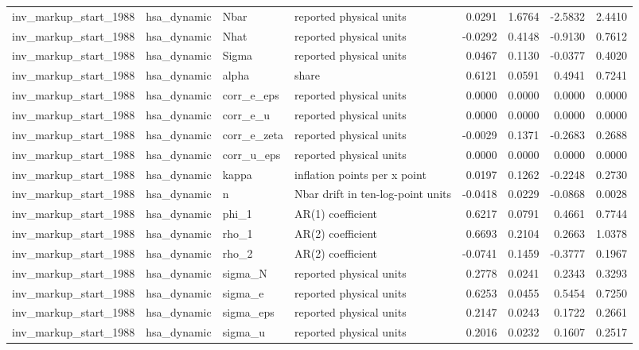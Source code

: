 \begin{tabular}{llllrrrr}
inv\_markup\_start\_1988 & hsa\_dynamic & Nbar & reported physical units & 0.0291 & 1.6764 & -2.5832 & 2.4410 \\
inv\_markup\_start\_1988 & hsa\_dynamic & Nhat & reported physical units & -0.0292 & 0.4148 & -0.9130 & 0.7612 \\
inv\_markup\_start\_1988 & hsa\_dynamic & Sigma & reported physical units & 0.0467 & 0.1130 & -0.0377 & 0.4020 \\
inv\_markup\_start\_1988 & hsa\_dynamic & alpha & share & 0.6121 & 0.0591 & 0.4941 & 0.7241 \\
inv\_markup\_start\_1988 & hsa\_dynamic & corr\_e\_eps & reported physical units & 0.0000 & 0.0000 & 0.0000 & 0.0000 \\
inv\_markup\_start\_1988 & hsa\_dynamic & corr\_e\_u & reported physical units & 0.0000 & 0.0000 & 0.0000 & 0.0000 \\
inv\_markup\_start\_1988 & hsa\_dynamic & corr\_e\_zeta & reported physical units & -0.0029 & 0.1371 & -0.2683 & 0.2688 \\
inv\_markup\_start\_1988 & hsa\_dynamic & corr\_u\_eps & reported physical units & 0.0000 & 0.0000 & 0.0000 & 0.0000 \\
inv\_markup\_start\_1988 & hsa\_dynamic & kappa & inflation points per x point & 0.0197 & 0.1262 & -0.2248 & 0.2730 \\
inv\_markup\_start\_1988 & hsa\_dynamic & n & Nbar drift in ten-log-point units & -0.0418 & 0.0229 & -0.0868 & 0.0028 \\
inv\_markup\_start\_1988 & hsa\_dynamic & phi\_1 & AR(1) coefficient & 0.6217 & 0.0791 & 0.4661 & 0.7744 \\
inv\_markup\_start\_1988 & hsa\_dynamic & rho\_1 & AR(2) coefficient & 0.6693 & 0.2104 & 0.2663 & 1.0378 \\
inv\_markup\_start\_1988 & hsa\_dynamic & rho\_2 & AR(2) coefficient & -0.0741 & 0.1459 & -0.3777 & 0.1967 \\
inv\_markup\_start\_1988 & hsa\_dynamic & sigma\_N & reported physical units & 0.2778 & 0.0241 & 0.2343 & 0.3293 \\
inv\_markup\_start\_1988 & hsa\_dynamic & sigma\_e & reported physical units & 0.6253 & 0.0455 & 0.5454 & 0.7250 \\
inv\_markup\_start\_1988 & hsa\_dynamic & sigma\_eps & reported physical units & 0.2147 & 0.0243 & 0.1722 & 0.2661 \\
inv\_markup\_start\_1988 & hsa\_dynamic & sigma\_u & reported physical units & 0.2016 & 0.0232 & 0.1607 & 0.2517 \\

\end{tabular}
